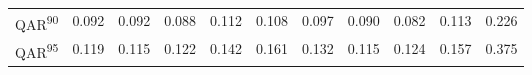 \begin{tabular}{lrrrrrrrrrr}
QAR\textsuperscript{90} & {\cellcolor[HTML]{E1E1E1}} \color[HTML]{000000} 0.092 & {\cellcolor[HTML]{E1E1E1}} \color[HTML]{000000} 0.092 & {\cellcolor[HTML]{E7E7E7}} \color[HTML]{000000} 0.088 & {\cellcolor[HTML]{BFBFBF}} \color[HTML]{000000} 0.112 & {\cellcolor[HTML]{C5C5C5}} \color[HTML]{000000} 0.108 & {\cellcolor[HTML]{D8D8D8}} \color[HTML]{000000} 0.097 & {\cellcolor[HTML]{E3E3E3}} \color[HTML]{000000} 0.090 & {\cellcolor[HTML]{F1F1F1}} \color[HTML]{000000} 0.082 & {\cellcolor[HTML]{BDBDBD}} \color[HTML]{000000} 0.113 & {\cellcolor[HTML]{000000}} \color[HTML]{F1F1F1} 0.226 \\
QAR\textsuperscript{95} & {\cellcolor[HTML]{EEEEEE}} \color[HTML]{000000} 0.119 & {\cellcolor[HTML]{F1F1F1}} \color[HTML]{000000} 0.115 & {\cellcolor[HTML]{EBEBEB}} \color[HTML]{000000} 0.122 & {\cellcolor[HTML]{D8D8D8}} \color[HTML]{000000} 0.142 & {\cellcolor[HTML]{C6C6C6}} \color[HTML]{000000} 0.161 & {\cellcolor[HTML]{E1E1E1}} \color[HTML]{000000} 0.132 & {\cellcolor[HTML]{F1F1F1}} \color[HTML]{000000} 0.115 & {\cellcolor[HTML]{E9E9E9}} \color[HTML]{000000} 0.124 & {\cellcolor[HTML]{CACACA}} \color[HTML]{000000} 0.157 & {\cellcolor[HTML]{000000}} \color[HTML]{F1F1F1} 0.375 \\
\bottomrule
\end{tabular}
